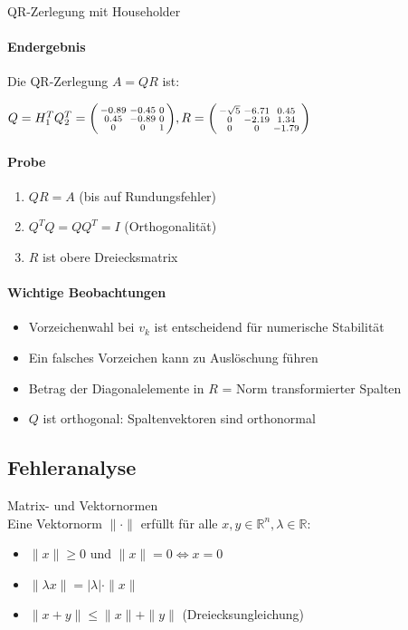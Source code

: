 \begin{example2}[breakable]{QR-Zerlegung mit Householder}
\paragraph{Endergebnis}
Die QR-Zerlegung $A = QR$ ist:

$Q = H_1^TQ_2^T = \begin{psmallmatrix}
-0.89 & -0.45 & 0\\
0.45 & -0.89 & 0\\
0 & 0 & 1
\end{psmallmatrix},
R = \begin{psmallmatrix}
-\sqrt{5} & -6.71 & 0.45\\
0 & -2.19 & 1.34\\
0 & 0 & -1.79
\end{psmallmatrix}$

\paragraph{Probe}
\begin{enumerate}
    \item $QR = A$ (bis auf Rundungsfehler)
    \item $Q^TQ = QQ^T = I$ (Orthogonalität)
    \item $R$ ist obere Dreiecksmatrix
\end{enumerate}

\paragraph{Wichtige Beobachtungen}
\small
\begin{itemize}
    \item Vorzeichenwahl bei $v_k$ ist entscheidend für numerische Stabilität
    \item Ein falsches Vorzeichen kann zu Auslöschung führen
    \item Betrag der Diagonalelemente in $R$ = Norm transformierter Spalten
    \item $Q$ ist orthogonal: Spaltenvektoren sind orthonormal
\end{itemize}
\end{example2}




\subsection{Fehleranalyse}

\begin{definition}{Matrix- und Vektornormen}\\
Eine Vektornorm $\|\cdot\|$ erfüllt für alle $x,y \in \mathbb{R}^n, \lambda \in \mathbb{R}$:
\begin{itemize}
    \item $\|x\| \geq 0$ und $\|x\| = 0 \Leftrightarrow x = 0$
    \item $\|\lambda x\| = |\lambda| \cdot \|x\|$
    \item $\|x + y\| \leq \|x\| + \|y\|$ (Dreiecksungleichung)
\end{itemize}
\end{definition}

